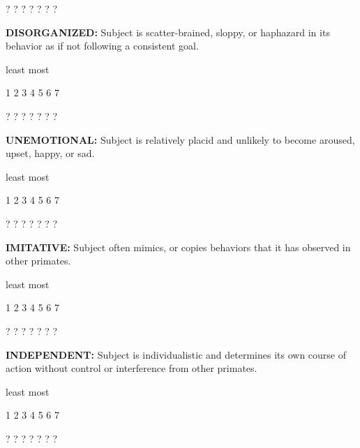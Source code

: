 \documentclass{article} %
\begin{document}
  ?    ?    ?    ?    ?    ?    ?   

\noindent  

\noindent \textbf{DISORGANIZED:} Subject is scatter-brained, sloppy, or haphazard in its behavior as if not following a consistent goal. 

\noindent  

\noindent least                            most

  1    2    3    4    5    6    7   

  ?    ?    ?    ?    ?    ?    ?   

\noindent  

\noindent \textbf{UNEMOTIONAL:} Subject is relatively placid and unlikely to become aroused, upset, happy, or sad. 

\noindent  

\noindent least                            most

  1    2    3    4    5    6    7   

  ?    ?    ?    ?    ?    ?    ?   

\noindent \textbf{IMITATIVE:} Subject often mimics, or copies behaviors that it has observed in other primates. 

\noindent  

\noindent least                            most

  1    2    3    4    5    6    7   

  ?    ?    ?    ?    ?    ?    ?   

\noindent  

\noindent \textbf{INDEPENDENT:} Subject is individualistic and determines its own course of action without control or interference from other primates. 

\noindent  

\noindent least                            most

  1    2    3    4    5    6    7   

  ?    ?    ?    ?    ?    ?    ?   
\end{document}
